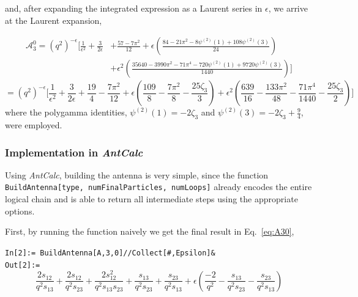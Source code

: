 and, after expanding the integrated expression as a Laurent series in $\epsilon$, we arrive at the Laurent expansion,

\begin{equation*}
    \begin{split}
        \mathcal A_3^0 = \left(q^2\right)^{-\epsilon}\Bigg[\frac1{\epsilon^2}+\frac3{2\epsilon}&+\frac{57-7\pi^2}{12}+\epsilon\left(\frac{84-21\pi^2-8\psi^{(2)}(1)+108\psi^{(2)}(3)}{24}\right)\\
        &+\epsilon^2\left(\frac{35640-3990\pi^2-71\pi^4-720\psi^{(2)}(1)+9720\psi^{(2)}(3)}{1440}\right)\Bigg]
    \end{split}
\end{equation*}
\begin{equation}
    = \left(q^2\right)^{-\epsilon}\Bigg[\frac1{\epsilon^2}+\frac3{2\epsilon}+\frac{19}4-\frac{7\pi^2}{12}+\epsilon\left(\frac{109}{8}-\frac{7\pi^2}8-\frac{25\zeta_3}{3}\right)+\epsilon^2\left(\frac{639}{16}-\frac{133\pi^2}{48}-\frac{71\pi^4}{1440}-\frac{25\zeta_3}{2}\right)\Bigg]
\end{equation}
where the polygamma identities, $\psi^{(2)}(1) = -2\zeta_3$ and $\psi^{(2)}(3) = -2\zeta_3 + \frac94$,
were employed.

\subsubsection*{Implementation in \textit{AntCalc}}

Using \textit{AntCalc}, building the antenna is very simple, since the
function \texttt{BuildAntenna[type, numFinalParticles, numLoops]} already encodes the entire 
logical chain and is able to return all intermediate steps using the appropriate options. 

First, by running the function naively we get the final result in Eq.~\eqref{eq:A30},

\begin{mdframed}[backgroundcolor=gray!10, linewidth=0pt]
\texttt{In[2]:= BuildAntenna[A,3,0]//Collect[\#,Epsilon]\&}\\
\hfill
\texttt{Out[2]:=}
    \begin{equation*}
        \frac{2s_{12}}{q^2 s_{13}} + \frac{2s_{12}}{q^2 s_{23}} + \frac{2s_{12}^2}{q^2 s_{13}s_{23}} + \frac{s_{13}}{q^2 s_{23}} + \frac{s_{23}}{q^2 s_{13}} + \epsilon\left(\frac{-2}{q^2} - \frac{s_{13}}{q^2 s_{23}} - \frac{s_{23}}{q^2 s_{13}}\right)
    \end{equation*}
\end{mdframed}

